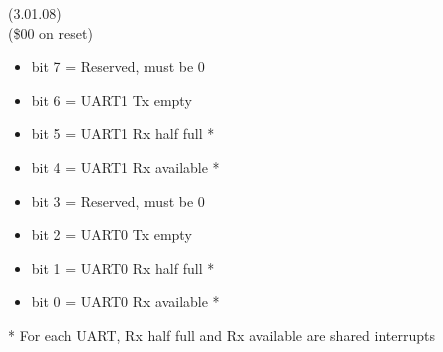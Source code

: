 (3.01.08)\\
(\$00 on reset)
\begin{itemize}
\item bit 7 = Reserved, must be 0
\item bit 6 = UART1 Tx empty
\item bit 5 = UART1 Rx half full *
\item bit 4 = UART1 Rx available *
\item bit 3 = Reserved, must be 0
\item bit 2 = UART0 Tx empty
\item bit 1 = UART0 Rx half full *
\item bit 0 = UART0 Rx available *
\end{itemize}
* For each UART, Rx half full and Rx available are shared interrupts

